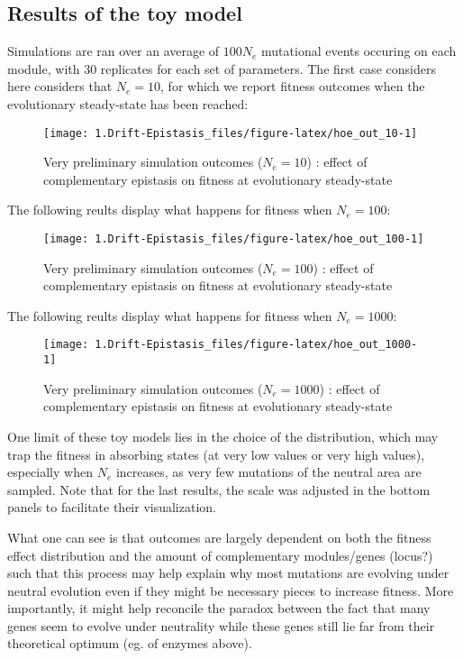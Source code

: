 \documentclass[]{article}
\begin{document}
\hypertarget{results-of-the-toy-model}{%
\subsection{Results of the toy model}\label{results-of-the-toy-model}}

Simulations are ran over an average of \(100N_e\) mutational events
occuring on each module, with 30 replicates for each set of parameters.
The first case considers here considers that \(N_e=10\), for which we
report fitness outcomes when the evolutionary steady-state has been
reached:

\begin{figure}

{\centering \texttt{[image: 1.Drift-Epistasis\_files/figure-latex/hoe\_out\_10-1]} 

}

\caption{Very preliminary simulation outcomes ($N_e=10$) : effect of complementary epistasis on fitness at evolutionary steady-state}\label{fig:hoe_out_10}
\end{figure}

The following reults display what happens for fitness when \(N_e=100\):

\begin{figure}

{\centering \texttt{[image: 1.Drift-Epistasis\_files/figure-latex/hoe\_out\_100-1]} 

}

\caption{Very preliminary simulation outcomes ($N_e=100$) : effect of complementary epistasis on fitness at evolutionary steady-state}\label{fig:hoe_out_100}
\end{figure}

The following reults display what happens for fitness when \(N_e=1000\):

\begin{figure}

{\centering \texttt{[image: 1.Drift-Epistasis\_files/figure-latex/hoe\_out\_1000-1]} 

}

\caption{Very preliminary simulation outcomes ($N_e=1000$) : effect of complementary epistasis on fitness at evolutionary steady-state}\label{fig:hoe_out_1000}
\end{figure}

One limit of these toy models lies in the choice of the distribution,
which may trap the fitness in absorbing states (at very low values or
very high values), especially when \(N_e\) increases, as very few
mutations of the neutral area are sampled. Note that for the last
results, the scale was adjusted in the bottom panels to facilitate their
visualization.

What one can see is that outcomes are largely dependent on both the
fitness effect distribution and the amount of complementary
modules/genes (locus?) such that this process may help explain why most
mutations are evolving under neutral evolution even if they might be
necessary pieces to increase fitness. More importantly, it might help
reconcile the paradox between the fact that many genes seem to evolve
under neutrality while these genes still lie far from their theoretical
optimum (eg. of enzymes above).
\end{document}

